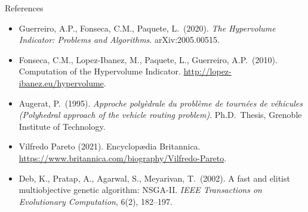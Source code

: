 \documentclass[aspectratio=169,10pt]{beamer}
\begin{document}
\begin{frame}{References}
  \begin{itemize}
    \item Guerreiro, A.P., Fonseca, C.M., Paquete, L.\ (2020).
      \textit{The Hypervolume Indicator: Problems and Algorithms}.
      arXiv:2005.00515.

    \item Fonseca, C.M., Lopez-Ibanez, M., Paquete, L., Guerreiro, A.P.\
      (2010). Computation of the Hypervolume Indicator.
      \url{http://lopez-ibanez.eu/hypervolume}.

    \item Augerat, P.\ (1995). \textit{Approche poly\`edrale du probl\`eme
      de tourn\'ees de v\'ehicules (Polyhedral approach of the vehicle
      routing problem)}. Ph.D.\ Thesis, Grenoble Institute of Technology.

    \item Vilfredo Pareto (2021). Encyclop\ae dia Britannica.
      \url{https://www.britannica.com/biography/Vilfredo-Pareto}.

    \item Deb, K., Pratap, A., Agarwal, S., Meyarivan, T.\ (2002).
      A fast and elitist multiobjective genetic algorithm: NSGA-II.
      \textit{IEEE Transactions on Evolutionary Computation}, 6(2), 182--197.
  \end{itemize}
\end{frame}
\end{document}
